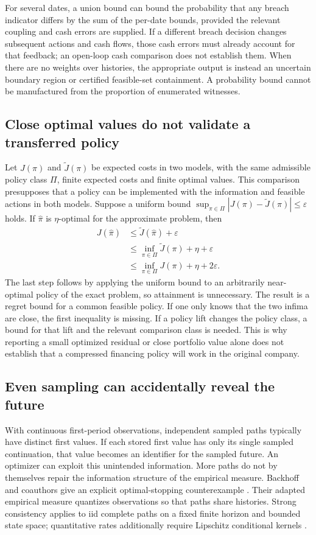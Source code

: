 \documentclass[11pt,a4paper]{article}
\begin{document}
For several dates, a union bound can bound the probability that any breach
indicator differs by the sum of the per-date bounds, provided the relevant
coupling and cash errors are supplied. If a different breach decision changes
subsequent actions and cash flows, those cash errors must already account for
that feedback; an open-loop cash comparison does not establish them. When
there are no weights over histories, the appropriate output is instead an
uncertain boundary region or certified feasible-set containment. A probability
bound cannot be manufactured from the proportion of enumerated witnesses.

\subsection{Close optimal values do not validate a transferred policy}
Let $J(\pi)$ and $\widetilde J(\pi)$ be expected costs in two models, with
the same admissible policy class $\Pi$, finite expected costs and finite optimal values. This comparison presupposes that a
policy can be implemented with the information and feasible actions in both
models. Suppose a uniform bound
$\sup_{\pi\in\Pi}|J(\pi)-\widetilde J(\pi)|\leq\varepsilon$ holds.
If $\widehat\pi$ is $\eta$-optimal for the approximate problem, then
\begin{align}
J(\widehat\pi)&\leq\widetilde J(\widehat\pi)+\varepsilon\nonumber\\
&\leq\inf_{\pi\in\Pi}\widetilde J(\pi)+\eta+\varepsilon\nonumber\\
&\leq\inf_{\pi\in\Pi}J(\pi)+\eta+2\varepsilon.
\end{align}
The last step follows by applying the uniform bound to an arbitrarily
near-optimal policy of the exact problem, so attainment is unnecessary.
The result is a regret bound for a common feasible policy. If one only knows
that the two infima are close, the first inequality is missing. If a policy
lift changes the policy class, a bound for that lift and the relevant comparison
class is needed. This is why reporting a small optimized residual or close
portfolio value alone does not establish that a compressed financing policy
will work in the original company.

\subsection{Even sampling can accidentally reveal the future}
With continuous first-period observations, independent sampled paths typically
have distinct first values. If each stored first value has only its single
sampled continuation, that value becomes an identifier for the sampled future.
An optimizer can exploit this unintended information. More paths do not by
themselves repair the information structure of the empirical measure.
Backhoff and coauthors give an explicit optimal-stopping counterexample
\cite[Example~7.1]{estimation}. Their adapted empirical measure quantizes
observations so that paths share histories. Strong consistency applies to
iid complete paths on a fixed finite horizon and bounded state space;
quantitative rates additionally require Lipschitz conditional kernels
\cite[Definitions~1.1--1.2, Theorems~1.3, 1.5, 1.7]{estimation}.
\end{document}
